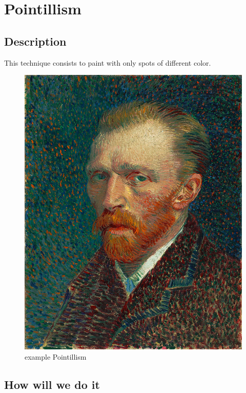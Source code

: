 \documentclass[12pt]{article}
\begin{document}
\section{Pointillism}

\subsection*{Description}

This technique consists to paint with only spots of different color.

\begin{figure}[!ht]
    \begin{center}
        \includegraphics[scale=0.15]{image/VanGogh.jpg}
        \caption{example Pointillism}
    \end{center}
\end{figure}

\subsection*{How will we do it}
\end{document}
